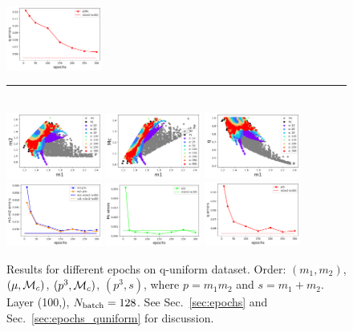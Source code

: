\documentclass[prd,aps,twocolumn,a4paper,showkeys,nofootinbib]{revtex4-1}
\def\Mc{{\cal M}_c}
\begin{document}
\begin{figure}[]
  \includegraphics[width=0.28\textwidth]{./Figs/quniform_p3Mc_err_q.png} \\
  \rule[1ex]{14cm}{0.5pt}\\
  \includegraphics[width=0.28\textwidth]{./Figs/quniform_p3s_rainbow_m1m2.png}
  \includegraphics[width=0.28\textwidth]{./Figs/quniform_p3s_rainbow_m1Mc.png}
  \includegraphics[width=0.28\textwidth]{./Figs/quniform_p3s_rainbow_m1q.png} \\
  \includegraphics[width=0.28\textwidth]{./Figs/quniform_p3s_err_m1m2.png}
  \includegraphics[width=0.28\textwidth]{./Figs/quniform_p3s_err_Mc.png}
  \includegraphics[width=0.28\textwidth]{./Figs/quniform_p3s_err_q.png} \\
  \caption{\label{fig:epochs_quniform} Results for different epochs on q-uniform dataset. Order:
  $(m_1, m_2)$, $(\mu, \Mc)$, $(p^3, \Mc)$, $(p^3, s)$, where
  $p=m_1 m_2$ and $s=m_1+m_2$. Layer (100,), $N_{\rm batch}=128$. 
  See Sec.~\ref{sec:epochs} and Sec.~\ref{sec:epochs_quniform} for discussion. }
\end{figure}
\end{document}
